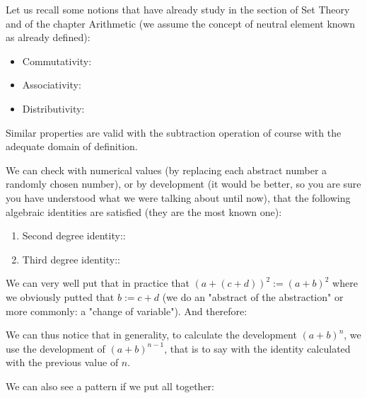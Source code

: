 	Let us recall some notions that have already study in the section of Set Theory and of the chapter Arithmetic (we assume the concept of neutral element known as already defined):
	\begin{itemize}
		\item Commutativity:
		
		
		\item Associativity:
		
		
		\item Distributivity:
		
	\end{itemize}
	Similar properties are valid with the subtraction operation of course with the adequate domain of definition.
	
	\pagebreak
	We can check with numerical values (by replacing each abstract number a randomly chosen number), or by development (it would be better, so you are sure you have understood what we were talking about until now), that the following algebraic identities are satisfied (they are the most known one):
	\begin{enumerate}
		\item Second degree identity::
		
		\item Third degree identity::
		
	\end{enumerate}
	\begin{tcolorbox}[title=Remark,colframe=black,arc=10pt]
	We can very well put that in practice that $(a+(c+d))^2:=(a+b)^2$ where we obviously putted that $b:=c+d$ (we do an "abstract of the abstraction" or more commonly: a "change of variable"). And therefore:
	
	\end{tcolorbox}
	We can thus notice that in generality, to calculate the development $(a+b)^n$, we use the development of $(a+b)^{n-1}$, that is to say with the identity calculated with the previous value of $n$.
	
	We can also see a pattern if we put all together:
	
